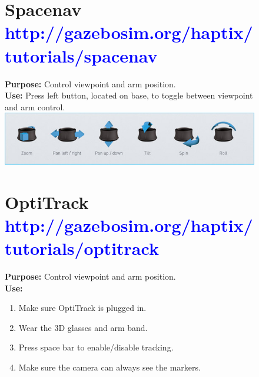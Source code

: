\documentclass[11pt, letterpaper, landscape]{article}
\begin{document}
\begin{figure}[!htb]
  \centering

  \begin{minipage}[t]{0.48\textwidth}
    \begin{tcolorbox}[height=6cm,colback=gray!8,colframe=gray!15]
      \section*{Spacenav \textcolor{blue}{\textnormal{\small http://gazebosim.org/haptix/tutorials/spacenav}}}
      {\bf Purpose:} Control viewpoint and arm position.\\
      {\bf Use:} Press left button, located on base, to toggle between viewpoint and arm control.\\
      \newline
      \includegraphics[width=1.0\textwidth]{spacenav_control.jpg}
    \end{tcolorbox}
  \end{minipage}%
  \hspace{0.02\textwidth}%
  \begin{minipage}[t]{0.48\textwidth}
    \begin{tcolorbox}[height=6cm,colback=gray!8,colframe=gray!15]
      \section*{OptiTrack \textcolor{blue}{\textnormal{\small http://gazebosim.org/haptix/tutorials/optitrack}}}
      {\bf Purpose:} Control viewpoint and arm position.\\
      {\bf Use:}
      \begin{enumerate}
        \item Make sure OptiTrack is plugged in.
        \item Wear the 3D glasses and arm band. 
        \item Press space bar to enable/disable tracking. 
        \item Make sure the camera can always see the markers.
      \end{enumerate}
    \end{tcolorbox}
  \end{minipage}%

\end{figure}
\end{document}
